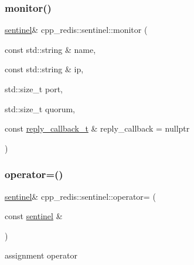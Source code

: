 \mbox{\label{classcpp__redis_1_1sentinel_ad4ae72b60a5a03977cda0d3e1f4ee48d}} 
\subsubsection{\texorpdfstring{monitor()}{monitor()}}
{\footnotesize\ttfamily \hyperlink{classcpp__redis_1_1sentinel}{sentinel}\& cpp\+\_\+redis\+::sentinel\+::monitor (\begin{DoxyParamCaption}\item[{const std\+::string \&}]{name,  }\item[{const std\+::string \&}]{ip,  }\item[{std\+::size\+\_\+t}]{port,  }\item[{std\+::size\+\_\+t}]{quorum,  }\item[{const \hyperlink{classcpp__redis_1_1sentinel_ae1a150ff8787208c47414397a061c9a7}{reply\+\_\+callback\+\_\+t} \&}]{reply\+\_\+callback = {\ttfamily nullptr} }\end{DoxyParamCaption})}

\mbox{\label{classcpp__redis_1_1sentinel_a06b8d049160e3990cdac3158aaf160a6}} 
\subsubsection{\texorpdfstring{operator=()}{operator=()}}
{\footnotesize\ttfamily \hyperlink{classcpp__redis_1_1sentinel}{sentinel}\& cpp\+\_\+redis\+::sentinel\+::operator= (\begin{DoxyParamCaption}\item[{const \hyperlink{classcpp__redis_1_1sentinel}{sentinel} \&}]{ }\end{DoxyParamCaption})\hspace{0.3cm}{\ttfamily [delete]}}



assignment operator 

\mbox{\label{classcpp__redis_1_1sentinel_aba0190b2773d4d1f8d5e4c5aac22ce19}} 
